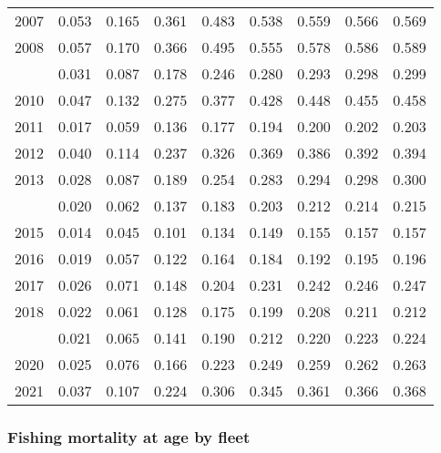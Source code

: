 \documentclass[
]{article}
\begin{document}
\begin{longtable}[t]{lrrrrrrrr}
2007 & 0.053 & 0.165 & 0.361 & 0.483 & 0.538 & 0.559 & 0.566 & 0.569\\
2008 & 0.057 & 0.170 & 0.366 & 0.495 & 0.555 & 0.578 & 0.586 & 0.589\\
\addlinespace
2009 & 0.031 & 0.087 & 0.178 & 0.246 & 0.280 & 0.293 & 0.298 & 0.299\\
2010 & 0.047 & 0.132 & 0.275 & 0.377 & 0.428 & 0.448 & 0.455 & 0.458\\
2011 & 0.017 & 0.059 & 0.136 & 0.177 & 0.194 & 0.200 & 0.202 & 0.203\\
2012 & 0.040 & 0.114 & 0.237 & 0.326 & 0.369 & 0.386 & 0.392 & 0.394\\
2013 & 0.028 & 0.087 & 0.189 & 0.254 & 0.283 & 0.294 & 0.298 & 0.300\\
\addlinespace
2014 & 0.020 & 0.062 & 0.137 & 0.183 & 0.203 & 0.212 & 0.214 & 0.215\\
2015 & 0.014 & 0.045 & 0.101 & 0.134 & 0.149 & 0.155 & 0.157 & 0.157\\
2016 & 0.019 & 0.057 & 0.122 & 0.164 & 0.184 & 0.192 & 0.195 & 0.196\\
2017 & 0.026 & 0.071 & 0.148 & 0.204 & 0.231 & 0.242 & 0.246 & 0.247\\
2018 & 0.022 & 0.061 & 0.128 & 0.175 & 0.199 & 0.208 & 0.211 & 0.212\\
\addlinespace
2019 & 0.021 & 0.065 & 0.141 & 0.190 & 0.212 & 0.220 & 0.223 & 0.224\\
2020 & 0.025 & 0.076 & 0.166 & 0.223 & 0.249 & 0.259 & 0.262 & 0.263\\
2021 & 0.037 & 0.107 & 0.224 & 0.306 & 0.345 & 0.361 & 0.366 & 0.368\\*
\end{longtable}

\hypertarget{fishing-mortality-at-age-by-fleet}{%
\subsubsection{Fishing mortality at age by
fleet}\label{fishing-mortality-at-age-by-fleet}}
\end{document}

